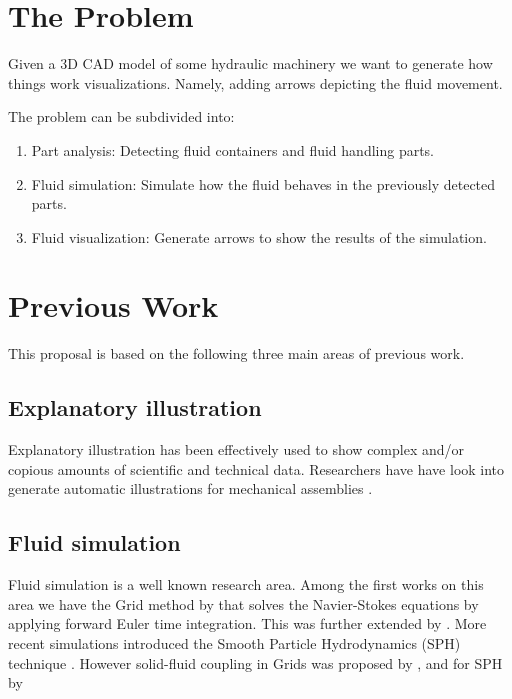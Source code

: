 \documentclass[11pt]{report}
\begin{document}

\section{The Problem}
\label{sec:problem}

Given a 3D CAD model of some hydraulic machinery we want to generate 
how things work visualizations. Namely, adding arrows depicting the fluid movement.

The problem can be subdivided into:
\begin{enumerate}
\item Part analysis: Detecting fluid containers and fluid handling parts.
\item Fluid simulation: Simulate how the fluid behaves in the previously detected parts.
\item Fluid visualization: Generate arrows to show the results of the simulation. 
\end{enumerate}

\section{Previous Work}

This proposal is based on the following three main areas of previous work.

\subsection{Explanatory illustration}

Explanatory illustration has been effectively used to show complex and/or
copious amounts of  scientific and technical data. Researchers have
have look into generate automatic illustrations for mechanical assemblies \cite{Mitra2010}.


\subsection{Fluid simulation}

Fluid simulation is a well known research area. Among the first works on this area
we have the Grid method by \cite{Foster1996} that solves the Navier-Stokes
equations by applying forward Euler time integration. This was further extended
by \cite{Stam1999}. More recent simulations introduced the Smooth
Particle Hydrodynamics (SPH) technique \cite{DesbrunMathieuandGascuel1996}. However solid-fluid
coupling in Grids was proposed by \cite{Carlson2004},  and for SPH by
\end{document}
